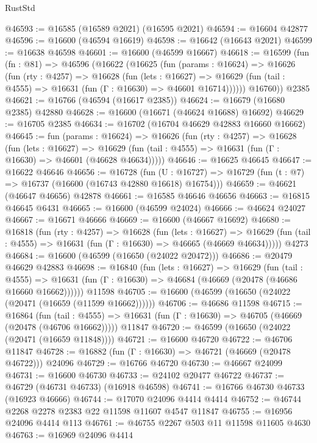 \begin{lexlean}{RustStd}
\begin{coremodule}
{\begin{coremodule}
{{{{{{{{{{{{{{{{{{{{{{{{{{{{{{{{{{{{{{{{{{{{{{{{{{{{{{{@46593 := @16585 (@16589 @2021) (@16595 @2021)
@46594 := @16604 @42877
@46596 := @16600 (@46594 @16619)
@46598 := @16642 (@16643 @2021)
@46599 := @16638 @46598
@46601 := @16600 (@46599 @16667)
@46618 := @16599
    (fun (fn : @81) =>
    @46596
      (@16622
        (@16625
          (fun (params : @16624) =>
          @16626
            (fun (rty : @4257) =>
            @16628
              (fun (lets : @16627) =>
              @16629 (fun (tail : @4555) => @16631 (fun (Γ : @16630) => @46601 @16714))))))
        @16760))
    @2385
@46621 := @16766 (@46594 (@16617 @2385))
@46624 := @16679 (@16680 @2385) @42880
@46628 := @16600 (@16671 (@46624 @16688) @16692)
@46629 := @16705 @2385
@46634 := @16702 (@16704 @46629 @42883 @16660 @16662)
@46645 := fun (params : @16624) =>
  @16626
    (fun (rty : @4257) =>
    @16628
      (fun (lets : @16627) =>
      @16629 (fun (tail : @4555) => @16631 (fun (Γ : @16630) => @46601 (@46628 @46634)))))
@46646 := @16625 @46645
@46647 := @16622 @46646
@46656 := @16728
    (fun (U : @16727) => @16729 (fun (t : @7) => @16737 (@16600 (@16743 @42880 @16618) @16754)))
@46659 := @46621 (@46647 @46656) @42878
@46661 := @16585 @46646 @46656
@46663 := @16815 @46645 @6431
@46665 := @16600 (@46599 @24024)
@46666 := @46624 @24027
@46667 := @16671 @46666
@46669 := @16600 (@46667 @16692)
@46680 := @16818
    (fun (rty : @4257) =>
    @16628
      (fun (lets : @16627) =>
      @16629 (fun (tail : @4555) => @16631 (fun (Γ : @16630) => @46665 (@46669 @46634)))))
    @4273
@46684 := @16600 (@46599 (@16650 (@24022 @20472)))
@46686 := @20479 @46629 @42883
@46698 := @16840
    (fun (lets : @16627) =>
    @16629
      (fun (tail : @4555) =>
      @16631 (fun (Γ : @16630) => @46684 (@46669 (@20478 (@46686 @16660 @16662))))))
    @11598
@46705 := @16600 (@46599 (@16650 (@24022 (@20471 (@16659 (@11599 @16662))))))
@46706 := @46686 @11598
@46715 := @16864
    (fun (tail : @4555) => @16631 (fun (Γ : @16630) => @46705 (@46669 (@20478 (@46706 @16662)))))
    @11847
@46720 := @46599 (@16650 (@24022 (@20471 (@16659 @11848))))
@46721 := @16600 @46720
@46722 := @46706 @11847
@46728 := @16882 (fun (Γ : @16630) => @46721 (@46669 (@20478 @46722))) @24096
@46729 := @16766 @46720
@46730 := @46667 @24099
@46731 := @16600 @46730
@46733 := @24102 @20477 @46722
@46737 := @46729 (@46731 @46733) (@16918 @46598)
@46741 := @16766 @46730 @46733 (@16923 @46666)
@46744 := @17070 @24096 @4414 @4414
@46752 := @46744 @2268 @2278 @2383 @22 @11598 @11607 @4547 @11847
@46755 := @16956 @24096 @4414 @113
@46761 := @46755 @2267 @503 @11 @11598 @11605 @4630
@46763 := @16969 @24096 @4414
}}}}}}}}}}}}}}}}}}}}}}}}}}}}}}}}}}}}}}}}}}}}}}}}}}}}}}}
\end{coremodule}}
\end{coremodule}
\end{lexlean}
